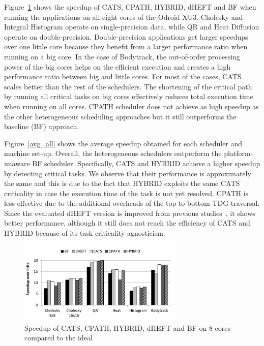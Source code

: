 Figure~\ref{BFLinear} shows the speedup of CATS, CPATH, HYBRID, dHEFT and BF when running the applications on all eight cores of the Odroid-XU3. Cholesky and Integral Histogram operate on single-precision data, while QR and Heat Diffusion operate on double-precision. Double-precision applications get larger speedups over one little core because they benefit from a larger performance ratio when running on a big core. In the case of Bodytrack, the out-of-order processing power of the big cores helps on the efficient execution and creates a high performance ratio between big and little cores. For most of the cases, CATS scales better than the rest of the schedulers. The shortening of the critical path by running all critical tasks on big cores effectively reduces total execution time when running on all cores. CPATH scheduler does not achieve as high speedup as the other heterogeneous scheduling approaches but it still outperforms the baseline (BF) approach.

Figure~\ref{avg_all} shows the average speedup obtained for each scheduler and machine set-up. 
Overall, the heterogeneous schedulers outperform the platform-unaware BF scheduler.
Specifically, CATS and HYBRID achieve a higher speedup by detecting critical tasks.
We observe that their performance is approximately the same and this is due to the fact that HYBRID exploits the same CATS criticality in case the execution time of the task is not yet resolved.
CPATH is less effective due to the additional overheads of the top-to-bottom TDG traversal.
Since the evaluated dHEFT version is improved from previous studies~\cite{Chronaki:ICS2015}, it shows better performance, although it still does not reach the efficiency of CATS and HYBRID because of its task criticality agnosticism.
\begin{figure}[!tl]
	\centering
	\includegraphics[width=0.7\textwidth]{images/8cores.pdf}
  	\caption{Speedup of CATS, CPATH, HYBRID, dHEFT and BF on 8 cores compared to the ideal}
  	\label{BFLinear}
  	\vspace{-0.4cm}
\end{figure}

